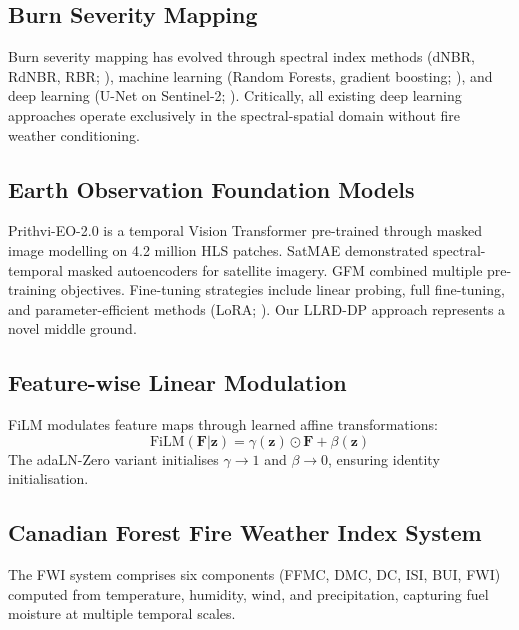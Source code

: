 \documentclass[review,12pt]{elsarticle}
\begin{document}
\subsection{Burn Severity Mapping}

Burn severity mapping has evolved through spectral index methods (dNBR, RdNBR, RBR; \citealt{key2006,miller2007,parks2014}), machine learning (Random Forests, gradient boosting; \citealt{collins2018,hislop2019}), and deep learning (U-Net on Sentinel-2; \citealt{knopp2020,hu2021,seydi2022}). Critically, all existing deep learning approaches operate exclusively in the spectral-spatial domain without fire weather conditioning.

\subsection{Earth Observation Foundation Models}

Prithvi-EO-2.0 \citep{jakubik2024} is a temporal Vision Transformer pre-trained through masked image modelling on 4.2 million HLS patches. SatMAE \citep{cong2022} demonstrated spectral-temporal masked autoencoders for satellite imagery. GFM \citep{mendieta2023} combined multiple pre-training objectives. Fine-tuning strategies include linear probing, full fine-tuning, and parameter-efficient methods (LoRA; \citealt{hu2022lora}). Our LLRD-DP approach represents a novel middle ground.

\subsection{Feature-wise Linear Modulation}

FiLM \citep{perez2018} modulates feature maps through learned affine transformations:
\begin{equation}
  \text{FiLM}(\mathbf{F} | \mathbf{z}) = \gamma(\mathbf{z}) \odot \mathbf{F} + \beta(\mathbf{z})
\end{equation}
The adaLN-Zero variant \citep{peebles2023} initialises $\gamma \to 1$ and $\beta \to 0$, ensuring identity initialisation.

\subsection{Canadian Forest Fire Weather Index System}

The FWI system \citep{vanwagner1987} comprises six components (FFMC, DMC, DC, ISI, BUI, FWI) computed from temperature, humidity, wind, and precipitation, capturing fuel moisture at multiple temporal scales.
\end{document}
